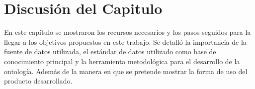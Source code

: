 %

\section{Discusión del Capitulo}

En este capítulo se mostraron los recursos necesarios y los pasos seguidos para la llegar a los objetivos propuestos en este trabajo. Se detalló la importancia de la fuente de datos utilizada, el estándar de datos utilizado como base de conocimiento principal y la herramienta metodológica para el desarrollo de la ontología. Además de la manera en que se pretende mostrar la forma de uso del producto desarrollado.





